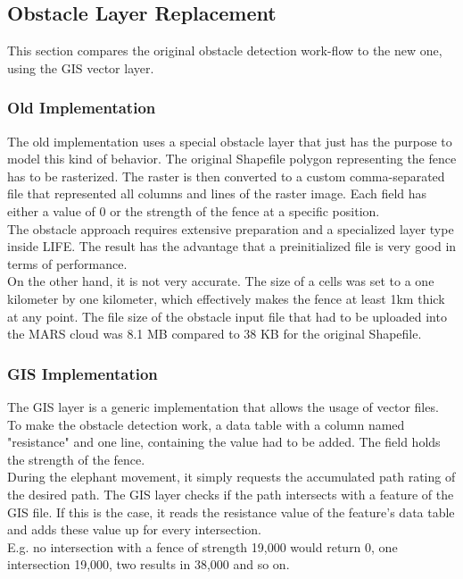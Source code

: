 \subsection{Obstacle Layer Replacement}
This section compares the original obstacle detection work-flow to the new one, using the GIS vector layer.

\subsubsection{Old Implementation}
The old implementation uses a special obstacle layer that just has the purpose to model this kind of behavior. The original Shapefile polygon representing the fence has to be rasterized. The raster is then converted to a custom comma-separated file that represented all columns and lines of the raster image. Each field has either a value of 0 or the strength of the fence at a specific position.\\
The obstacle approach requires extensive preparation and a specialized layer type inside LIFE. The result has the advantage that a preinitialized file is very good in terms of performance.\\
On the other hand, it is not very accurate. The size of a cells was set to a one kilometer by one kilometer, which effectively makes the fence at least 1km thick at any point. The file size of the obstacle input file that had to be uploaded into the MARS cloud was 8.1 MB compared to 38 KB for the original Shapefile.


\subsubsection{GIS  Implementation} \label{sec:gis_implementation}
The GIS layer is a generic implementation that allows the usage of vector files. To make the obstacle detection work, a data table with a column named "resistance" and one line, containing the value had to be added. The field holds the strength of the fence.\\
During the elephant movement, it simply requests the accumulated path rating of the desired path. The GIS layer checks if the path intersects with a feature of the GIS file. If this is the case, it reads the resistance value of the feature's data table and adds these value up for every intersection.\\
E.g. no intersection with a fence of strength 19,000 would return 0, one intersection 19,000, two results in 38,000 and so on.


